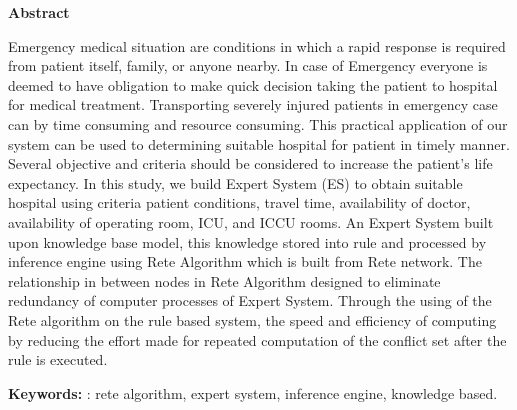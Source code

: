 {\centering
	\textbf{\large Abstract}\\
	\vspace{0.5cm}
}

  Emergency medical situation are conditions in which a rapid response is required from patient itself, family, or anyone nearby. In case of Emergency everyone is deemed to have obligation to make quick decision taking the patient to hospital for medical treatment. Transporting severely injured patients in emergency case can by time consuming and resource consuming. This practical application of our system can be used to determining suitable hospital for patient in timely manner.  Several objective and criteria should be considered to increase the patient’s life expectancy. In this study, we build Expert System (ES) to obtain suitable hospital using criteria patient conditions, travel time, availability of doctor, availability of operating room, ICU, and ICCU rooms. An Expert System built upon knowledge base model, this knowledge stored into rule and processed by inference engine using Rete Algorithm which is built from Rete network. The relationship in between nodes in Rete Algorithm designed to eliminate redundancy of computer processes of Expert System. Through the using of the Rete algorithm on the rule based system, the speed and efficiency of computing by reducing the effort made for repeated computation of the conflict set after the rule is executed.

\vspace{0.5 cm}
\begin{flushleft}
{\textbf{Keywords:} :  rete algorithm, expert system, inference engine, knowledge based.}
\end{flushleft}